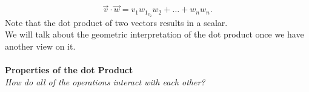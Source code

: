 \documentclass{report}
\begin{document}
\[
\vec{v}  \cdot  \vec{w} = v_1w_1_ v_2w_2 + \ldots + w_nw_n
.\] Note that the dot product of two vectors results in a scalar.\\
We will talk about the geometric interpretation of the dot product once we have another view on it.\\
\\
\textbf{Properties of the dot Product} \\
\textit{How do all of the operations interact with each other?} \\
\end{document}
